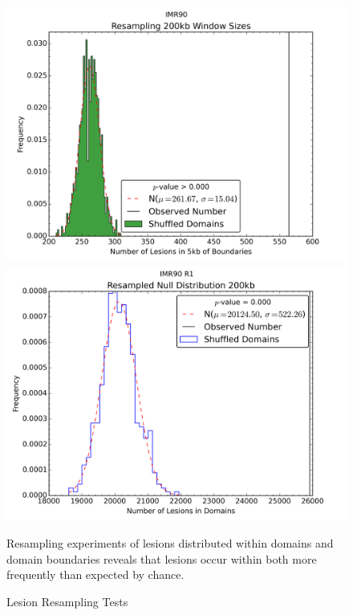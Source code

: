 \begin{figure}[H]
  \caption{Lesion Resampling Tests}\label{fig:LesionsResampled}
  \begin{minipage}{0.5\textwidth}%
    \includegraphics[width=\textwidth]{./figures/results/resamplingInBounds.png}
  \end{minipage}%
  \hfill
  \begin{minipage}{0.5\textwidth}
    \includegraphics[width=\textwidth]{./figures/results/resamplingInDomains.png}
  \end{minipage}
  \medskip
  \small
  Resampling experiments of lesions distributed within domains and domain boundaries reveals that lesions occur within both more
  frequently than expected by chance.
\end{figure}
